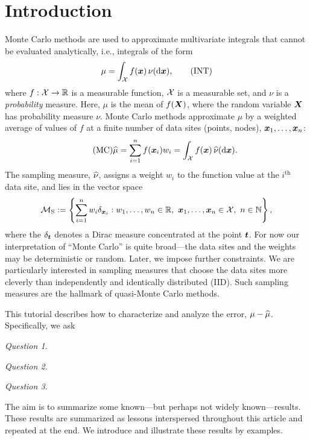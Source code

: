 \documentclass[graybox,footinfo]{svmult}
\begin{document}

\section{Introduction}
Monte Carlo methods are used to approximate multivariate integrals that cannot be evaluated analytically, i.e.,  integrals of the form
\begin{equation}
\mu = \int_{\cx} f(\bsx) \, \nu(\D \bsx), \label{INT} \tag{INT}
\end{equation}
where $f:\mathcal{X} \to {\mathbb{R}}$ is a measurable function, $\mathcal{X}$ is a measurable set, and $\nu$ is a 
\emph{probability} measure.  Here, $\mu$ is the mean of $f({\boldsymbol{X}})$, where the random 
variable ${\boldsymbol{X}}$ has probability measure $\nu$.  Monte Carlo methods approximate 
$\mu$ by a weighted average of values of $f$ at a finite number of data sites (points, 
nodes), ${\boldsymbol{x}}_1, \ldots, {\boldsymbol{x}}_n$:
\begin{equation} \label{AppxINT} \tag{MC}
\hmu = \sum_{i=1}^n f(\bsx_i) w_i = \int_{\cx} f(\bsx) \, \hnu(\D \bsx).
\end{equation}
The sampling measure, $\widehat{\nu}$, assigns a weight $w_i$ to the function value at the 
$i^{\text{th}}$ data site, and lies in the vector space
\begin{equation} \label{FJH:eq:sampmeaset}
\cm_{\textup{S}} := \left \{\sum_{i=1}^n w_i \delta_{\bsx_i} : w_1, \ldots, w_n \in \R,\ \bsx_1, 
\ldots, \bsx_n \in \calX, \ n \in \N \right \},
\end{equation}
where the $\delta_{{\boldsymbol{t}}}$ denotes a Dirac measure concentrated at the point ${\boldsymbol{t}}$.  
For now our interpretation of ``Monte Carlo'' is quite broad---the data sites and the 
weights may be deterministic or random.  Later, we impose further constraints.  We are 
particularly interested in sampling measures that choose the data sites more cleverly 
than independently and identically distributed (IID).  Such sampling measures are the 
hallmark of quasi-Monte Carlo methods.

This tutorial describes how to characterize and analyze the error, $\mu - \widehat{\mu}$.  
Specifically, we ask
\begin{list}{}{\setlength\leftmargin{7ex}\setlength{}}
\item[\emph{Question 1.}] \emph{\FJHQOne}
\item[\emph{Question 2.}] \emph{\FJHQTwo}
\item[\emph{Question 3.}] \emph{\FJHQThree}
\end{list}
\noindent The aim is to summarize some known---but perhaps not widely 
known---results.  These results are summarized as lessons interspersed throughout this 
article and repeated at the end.  We introduce and illustrate these 
results by examples.
\end{document}
